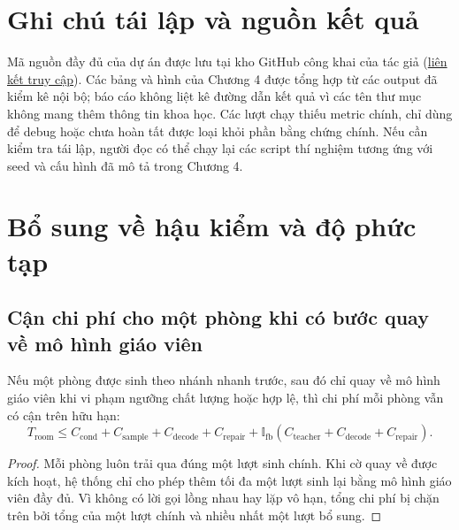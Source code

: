 \documentclass[oneside,a4paper,12pt]{extreport}
\begin{document}
\section{Ghi chú tái lập và nguồn kết quả}
\label{app:repro_paths}

Mã nguồn đầy đủ của dự án được lưu tại kho GitHub công khai của tác giả (\href{https://github.com/minhphuc477/KLTN.git}{liên kết truy cập}). Các bảng và hình của Chương 4 được tổng hợp từ các output đã kiểm kê nội bộ; báo cáo không liệt kê đường dẫn kết quả vì các tên thư mục không mang thêm thông tin khoa học. Các lượt chạy thiếu metric chính, chỉ dùng để debug hoặc chưa hoàn tất được loại khỏi phần bằng chứng chính. Nếu cần kiểm tra tái lập, người đọc có thể chạy lại các script thí nghiệm tương ứng với seed và cấu hình đã mô tả trong Chương 4.

\FloatBarrier
\section{Bổ sung về hậu kiểm và độ phức tạp}
\label{app:postprocess_complexity}

\subsection{Cận chi phí cho một phòng khi có bước quay về mô hình giáo viên}
Nếu một phòng được sinh theo nhánh nhanh trước, sau đó chỉ quay về mô hình giáo viên khi vi phạm ngưỡng chất lượng hoặc hợp lệ, thì chi phí mỗi phòng vẫn có cận trên hữu hạn:
\begin{equation}
T_{\text{room}}\le C_{\text{cond}}+C_{\text{sample}}+C_{\text{decode}}+C_{\text{repair}}+\mathbb{I}_{\text{fb}}\left(C_{\text{teacher}}+C_{\text{decode}}+C_{\text{repair}}\right).
\end{equation}
\begin{proof}
Mỗi phòng luôn trải qua đúng một lượt sinh chính. Khi cờ quay về được kích hoạt, hệ thống chỉ cho phép thêm tối đa một lượt sinh lại bằng mô hình giáo viên đầy đủ. Vì không có lời gọi lồng nhau hay lặp vô hạn, tổng chi phí bị chặn trên bởi tổng của một lượt chính và nhiều nhất một lượt bổ sung.
\end{proof}
\end{document}
